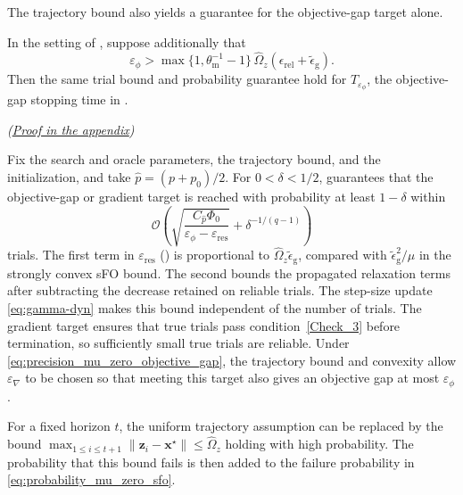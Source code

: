 \documentclass{article}
\begin{document}
The trajectory bound also yields a guarantee for the
objective-gap target alone.
\begin{corollary}
\label{cor:mu_zero_objective_gap}
In the setting of , suppose additionally that
\begin{equation}\label{eq:precision_mu_zero_objective_gap}
\varepsilon_\phi>
\max\{1,\theta_{\mathrm{m}}^{-1}-1\}\,
\widehat\Omega_z(\epsilon_{\mathrm{rel}}+\widetilde\epsilon_{\mathrm{g}}).
\end{equation}
Then the same trial bound and probability guarantee hold for
\(T_{\varepsilon_\phi}\), the objective-gap stopping time in
. 
\par\nobreak\hfill\textnormal{\small\itshape(\hyperref[proof:mu_zero_objective_gap]{Proof in the appendix})}\par
\end{corollary}
\begin{remark}
\label{rem:general_convex_interpretation}
Fix the search and oracle parameters, the trajectory bound,
and the initialization, and take $\hat p=(p+p_0)/2$.
For $0<\delta<1/2$,  guarantees
that the objective-gap or gradient target is reached with
probability at least $1-\delta$ within
\[
\mathcal{O}\!\left(
\sqrt{\frac{C_{\hat p}\Phi_0}
{\varepsilon_\phi-\varepsilon_{\mathrm{res}}}}
+\delta^{-1/(q-1)}
\right)
\]
trials. The first term in $\varepsilon_{\mathrm{res}}$ () is proportional to $\widehat\Omega_z\widetilde\epsilon_{\mathrm g}$, compared with $\widetilde\epsilon_{\mathrm g}^{2}/\mu$ in the strongly convex sFO bound. The second bounds the propagated relaxation terms after subtracting the decrease retained on reliable trials. The step-size update \eqref{eq:gamma-dyn} makes this bound independent of the number of trials.
The gradient target ensures that true trials pass
condition~\eqref{Check_3} before termination, so sufficiently
small true trials are reliable. Under
\eqref{eq:precision_mu_zero_objective_gap}, the trajectory bound
and convexity allow \(\varepsilon_\nabla\) to be chosen so that
meeting this target also gives an objective gap at most
\(\varepsilon_\phi\). 

For a fixed horizon $t$, the uniform trajectory assumption
can be replaced by the bound
$\max_{1\leq i\leq t+1}\|\bm{z}_i-\bm{x}^\star\|
\leq\widehat\Omega_z$
holding with high probability.
The probability that this bound fails is then added to the
failure probability in \eqref{eq:probability_mu_zero_sfo}.
\end{remark}
\end{document}
